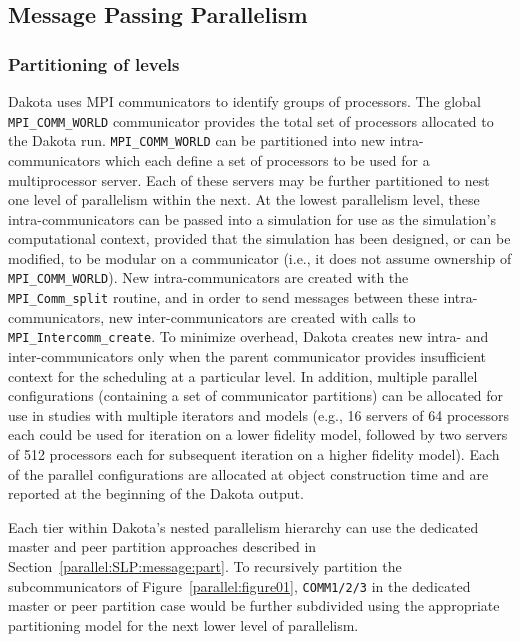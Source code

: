 \subsection{Message Passing Parallelism}\label{parallel:MLP:message}

\subsubsection{Partitioning of levels}\label{parallel:MLP:message:partitioning}

Dakota uses MPI communicators to identify groups of processors. The
global \texttt{MPI\_COMM\_WORLD} communicator provides the total set
of processors allocated to the Dakota run. \texttt{MPI\_COMM\_WORLD}
can be partitioned into new intra-communicators which each define a
set of processors to be used for a multiprocessor server. Each of
these servers may be further partitioned to nest one level of
parallelism within the next. At the lowest parallelism level, these
intra-communicators can be passed into a simulation for use as the
simulation's computational context, provided that the simulation has
been designed, or can be modified, to be modular on a communicator
(i.e., it does not assume ownership of \texttt{MPI\_COMM\_WORLD}). New
intra-communicators are created with the \texttt{MPI\_Comm\_split}
routine, and in order to send messages between these
intra-communicators, new inter-communicators are created with calls to
\texttt{MPI\_Intercomm\_create}. To minimize overhead, Dakota creates
new intra- and inter-communicators only when the parent communicator
provides insufficient context for the scheduling at a particular
level. In addition, multiple parallel configurations (containing a set
of communicator partitions) can be allocated for use in studies with
multiple iterators and models (e.g., 16 servers of 64 processors each
could be used for iteration on a lower fidelity model, followed by two
servers of 512 processors each for subsequent iteration on a higher
fidelity model).  Each of the parallel configurations are allocated
at object construction time and are reported at the beginning of the
Dakota output.

Each tier within Dakota's nested parallelism hierarchy can use the
dedicated master and peer partition approaches described in
Section~\ref{parallel:SLP:message:part}. To recursively partition the
subcommunicators of Figure~\ref{parallel:figure01},
\texttt{COMM1/2/3} in the dedicated master or peer partition case
would be further subdivided using the appropriate partitioning model
for the next lower level of parallelism.


